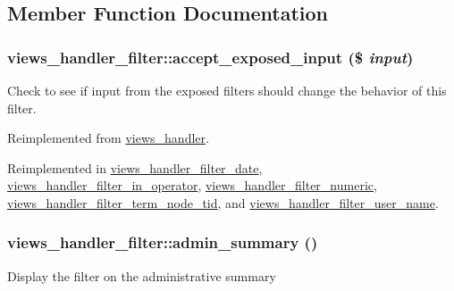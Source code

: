 \subsection{Member Function Documentation}
\hypertarget{classviews__handler__filter_88ccd2ef359009614abb48fb83c2a738}{
\subsubsection[{accept\_\-exposed\_\-input}]{\setlength{\rightskip}{0pt plus 5cm}views\_\-handler\_\-filter::accept\_\-exposed\_\-input (\$ {\em input})}}
\label{classviews__handler__filter_88ccd2ef359009614abb48fb83c2a738}


Check to see if input from the exposed filters should change the behavior of this filter. 

Reimplemented from \hyperlink{classviews__handler_20433153babc3196b26ee773755a709e}{views\_\-handler}.

Reimplemented in \hyperlink{classviews__handler__filter__date_063da758bf1832f38454620cbc94e304}{views\_\-handler\_\-filter\_\-date}, \hyperlink{classviews__handler__filter__in__operator_ff2b25941729b9ca81e1e53bb8e95a96}{views\_\-handler\_\-filter\_\-in\_\-operator}, \hyperlink{classviews__handler__filter__numeric_0fd6abb3062be32410bef3c1cefdaaf5}{views\_\-handler\_\-filter\_\-numeric}, \hyperlink{classviews__handler__filter__term__node__tid_75f38674ff356981f6e77f009da2101a}{views\_\-handler\_\-filter\_\-term\_\-node\_\-tid}, and \hyperlink{classviews__handler__filter__user__name_a6ae18031b13da1c92d83b8c5de74c15}{views\_\-handler\_\-filter\_\-user\_\-name}.\hypertarget{classviews__handler__filter_655263cd0b73188eec064b9a9743fe4c}{
\subsubsection[{admin\_\-summary}]{\setlength{\rightskip}{0pt plus 5cm}views\_\-handler\_\-filter::admin\_\-summary ()}}
\label{classviews__handler__filter_655263cd0b73188eec064b9a9743fe4c}


Display the filter on the administrative summary 

